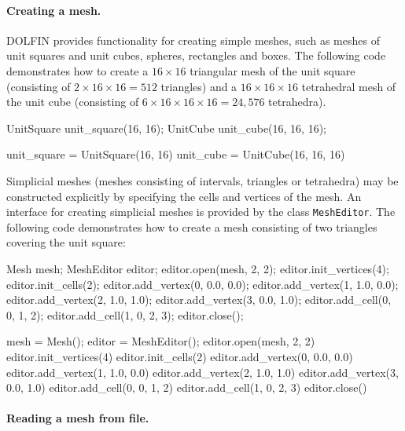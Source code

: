 \paragraph{Creating a mesh.}

DOLFIN provides functionality for creating simple meshes, such as
meshes of unit squares and unit cubes, spheres, rectangles and
boxes. The following code demonstrates how to create a $16\times 16$
triangular mesh of the unit square (consisting of $2\times 16\times 16
= 512$ triangles) and a $16\times 16\times 16$ tetrahedral mesh of the
unit cube (consisting of $6\times 16\times 16\times 16 = 24,576$
tetrahedra).

\begin{c++}
UnitSquare unit_square(16, 16);
UnitCube unit_cube(16, 16, 16);
\end{c++}

\begin{python}
unit_square = UnitSquare(16, 16)
unit_cube = UnitCube(16, 16, 16)
\end{python}

Simplicial meshes (meshes consisting of intervals, triangles or
tetrahedra) may be constructed explicitly by specifying the cells and
vertices of the mesh. An interface for creating simplicial meshes is
provided by the class \texttt{MeshEditor}. The following code
demonstrates how to create a mesh consisting of two triangles covering
the unit square:


\begin{c++}
Mesh mesh;
MeshEditor editor;
editor.open(mesh, 2, 2);
editor.init_vertices(4);
editor.init_cells(2);
editor.add_vertex(0, 0.0, 0.0);
editor.add_vertex(1, 1.0, 0.0);
editor.add_vertex(2, 1.0, 1.0);
editor.add_vertex(3, 0.0, 1.0);
editor.add_cell(0, 0, 1, 2);
editor.add_cell(1, 0, 2, 3);
editor.close();
\end{c++}

\begin{python}
mesh = Mesh();
editor = MeshEditor();
editor.open(mesh, 2, 2)
editor.init_vertices(4)
editor.init_cells(2)
editor.add_vertex(0, 0.0, 0.0)
editor.add_vertex(1, 1.0, 0.0)
editor.add_vertex(2, 1.0, 1.0)
editor.add_vertex(3, 0.0, 1.0)
editor.add_cell(0, 0, 1, 2)
editor.add_cell(1, 0, 2, 3)
editor.close()
\end{python}

\paragraph{Reading a mesh from file.}

